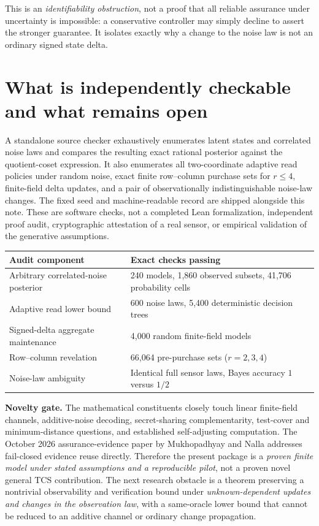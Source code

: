 \documentclass[11pt,letterpaper]{article}
\begin{document}
\noindent This is an \emph{identifiability obstruction}, not a proof that all reliable assurance under uncertainty is impossible: a conservative controller may simply decline to assert the stronger guarantee. It isolates exactly why a change to the noise law is not an ordinary signed state delta.

\section{What is independently checkable and what remains open}
A standalone source checker exhaustively enumerates latent states and correlated noise laws and compares the resulting exact rational posterior against the quotient-coset expression. It also enumerates all two-coordinate adaptive read policies under random noise, exact finite row--column purchase sets for \(r\le4\), finite-field delta updates, and a pair of observationally indistinguishable noise-law changes. The fixed seed and machine-readable record are shipped alongside this note. These are software checks, not a completed Lean formalization, independent proof audit, cryptographic attestation of a real sensor, or empirical validation of the generative assumptions.

\begin{center}\small
\begin{tabular}{ll}
\toprule
Audit component & Exact checks passing \\
\midrule
Arbitrary correlated-noise posterior & 240 models, 1,860 observed subsets, 41,706 probability cells\\
Adaptive read lower bound & 600 noise laws, 5,400 deterministic decision trees\\
Signed-delta aggregate maintenance & 4,000 random finite-field models\\
Row--column revelation & 66,064 pre-purchase sets (\(r=2,3,4\))\\
Noise-law ambiguity & Identical full sensor laws, Bayes accuracy \(1\) versus \(1/2\)\\
\bottomrule
\end{tabular}
\end{center}

\noindent\textbf{Novelty gate.} The mathematical constituents closely touch linear finite-field channels, additive-noise decoding, secret-sharing complementarity, test-cover and minimum-distance questions, and established self-adjusting computation. The October 2026 assurance-evidence paper by Mukhopadhyay and Nalla addresses fail-closed evidence reuse directly. Therefore the present package is a \emph{proven finite model under stated assumptions and a reproducible pilot}, not a proven novel general TCS contribution. The next research obstacle is a theorem preserving a nontrivial observability and verification bound under \emph{unknown-dependent updates and changes in the observation law}, with a same-oracle lower bound that cannot be reduced to an additive channel or ordinary change propagation.
\end{document}
